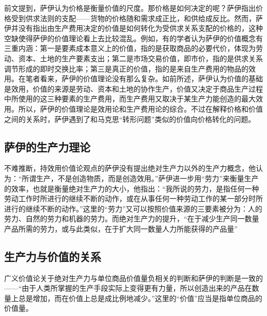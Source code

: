 前文提到，萨伊认为价格是衡量价值的尺度。那价格是如何决定的呢？萨伊指出价格受到供求法则的支配——货物的价格随和需求成正比，和供给成反比\cite[256]{SaYiZhengZhiJingJiXueGaiLunCaiFuDeShengChanFenPeiHeXiaoFei2020}。然而，萨伊并没有指出由生产费用决定的价值是如何转化为受供求关系支配的价格的，这种空缺使得萨伊的价值理论看上去比较混乱。例如，有的学者认为萨伊的价值概念有三重内涵：第一是要素成本意义上的价值，指的是获取商品的必要代价，体现为劳动、资本、土地的生产要素支出；第二是市场交易价值，即市价，指的是供求关系调节形成的即时交换比率；第三是真正的价值，指的是来自生产费用的物品的效用\cite[138]{YanZhiJieXiFangJingJiXueShuoShiJiaoChengDiErBan2013}\cite[175]{CaiJiMingCongGuDianZhengZhiJingJiXueDaoZhongGuoTeSeSheHuiZhuYiZhengZhiJingJiXueJiYuZhongGuoShiJiaoDeZhengZhiJingJiXueYanBianShangCe2023}。在笔者看来，萨伊的价值理论没有那么复杂。如前所述，萨伊认为价值的基础是效用，价值的来源是劳动、资本和土地的协作生产，价值又决定于商品生产过程中所使用的这三种要素的生产费用，而生产费用又取决于某生产力能创造的最大效用。所以，萨伊的价值理论是效用论和生产费用论的综合。不过在解释价格和价值之间的关系时，萨伊遇到了和马克思“转形问题”类似的价值向价格转化的问题。

\subsection{萨伊的生产力理论}

不难推断，持效用价值论观点的萨伊没有提出绝对生产力以外的生产力概念，他认为：“所谓生产，不是创造物质，而是创造效用。”\cite[60]{SaYiZhengZhiJingJiXueGaiLunCaiFuDeShengChanFenPeiHeXiaoFei2020}萨伊进一步用“劳力”来衡量生产的效率，也就是衡量绝对生产力的大小，他指出：“我所说的劳力，是指任何一种劳动工作时所进行的继续不断的动作，或在从事任何一种劳动工作的某一部分时所进行的继续不断的动作。”\cite[90]{SaYiZhengZhiJingJiXueGaiLunCaiFuDeShengChanFenPeiHeXiaoFei2020}这里的“劳力”又可以按照价值来源的三要素被分为：人的劳力、自然的劳力和机器的劳力\cite[90]{SaYiZhengZhiJingJiXueGaiLunCaiFuDeShengChanFenPeiHeXiaoFei2020}。而绝对生产力的提升，“在于减少生产同一数量产品所需的劳力，或与此类似，在于扩大同一数量人力所能获得的产品量”\cite[91]{SaYiZhengZhiJingJiXueGaiLunCaiFuDeShengChanFenPeiHeXiaoFei2020}

\subsection{生产力与价值的关系}

广义价值论关于绝对生产力与单位商品价值量负相关的判断和萨伊的判断是一致的——“由于人类所掌握的生产手段实际上变得更有力量，所以创造出来的产品在数量上总是增加，而在价值上总是成比例地减少。”\cite[369]{SaYiZhengZhiJingJiXueGaiLunCaiFuDeShengChanFenPeiHeXiaoFei2020}这里的“价值”应当是指单位商品的价值量。

